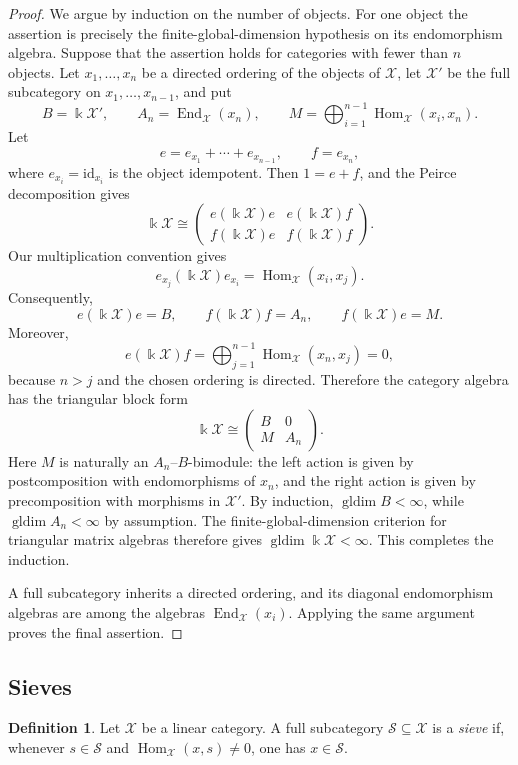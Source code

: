 \documentclass[12pt,a4paper,english,reqno]{amsart}
\theoremstyle{plain}
\theoremstyle{definition}
\newtheorem{definition}[theorem]{Definition}
\newcommand{\kk}{\Bbbk}
\newcommand{\Hom}{\operatorname{Hom}}
\newcommand{\End}{\operatorname{End}}
\newcommand{\gldim}{\operatorname{gldim}}
\newcommand{\id}{\mathrm{id}}
\newcommand{\X}{\mathcal X}
\begin{document}
\begin{proof}
We argue by induction on the number of objects.  For one object the assertion
is precisely the finite-global-dimension hypothesis on its endomorphism
algebra.  Suppose that the assertion holds for categories with fewer than
$n$ objects.  Let $x_1,\ldots,x_n$ be a directed ordering of the objects
of $\X$, let $\X'$ be the full subcategory on
$x_1,\ldots,x_{n-1}$, and put
\[
 B=\kk\X',\qquad A_n=\End_{\X}(x_n),\qquad
 M=\bigoplus_{i=1}^{n-1}\Hom_{\X}(x_i,x_n).
\]
Let
\[
e=e_{x_1}+\cdots+e_{x_{n-1}},
\qquad
f=e_{x_n},
\]
where $e_{x_i}=\id_{x_i}$ is the object idempotent. Then
$1=e+f$, and the Peirce decomposition gives
\[
\kk\X
\cong
\begin{pmatrix}
e(\kk\X)e & e(\kk\X)f\\
f(\kk\X)e & f(\kk\X)f
\end{pmatrix}.
\]
Our multiplication convention gives
\[
e_{x_j}(\kk\X)e_{x_i}
=
\Hom_{\X}(x_i,x_j).
\]
Consequently,
\[
e(\kk\X)e=B,
\qquad
f(\kk\X)f=A_n,
\qquad
f(\kk\X)e=M.
\]
Moreover,
\[
e(\kk\X)f
=
\bigoplus_{j=1}^{n-1}\Hom_{\X}(x_n,x_j)=0,
\]
because $n>j$ and the chosen ordering is directed. Therefore the
category algebra has the triangular block form
\[
\kk\X\cong
\begin{pmatrix}
B&0\\
M&A_n
\end{pmatrix}.
\]
Here $M$ is naturally an $A_n$--$B$-bimodule: the left action is
given by postcomposition with endomorphisms of $x_n$, and the right
action is given by precomposition with morphisms in $\X'$.
By induction,
$\gldim B<\infty$, while $\gldim A_n<\infty$ by assumption.  The
finite-global-dimension criterion for triangular matrix algebras
\cite[Corollary~6.3]{MinamotoYamaura} therefore gives
$\gldim\kk\X<\infty$.  This completes the induction.

A full subcategory inherits a directed ordering, and its diagonal
endomorphism algebras are among the algebras $\End_{\X}(x_i)$.  Applying
the same argument proves the final assertion.
\end{proof}

\subsection{Sieves}

\begin{definition}
Let $\X$ be a linear category.  A full subcategory $\mathcal S\subseteq\X$
is a \emph{sieve} if, whenever $s\in\mathcal S$ and
$\Hom_{\X}(x,s)\neq0$, one has $x\in\mathcal S$.
\end{definition}
\end{document}

